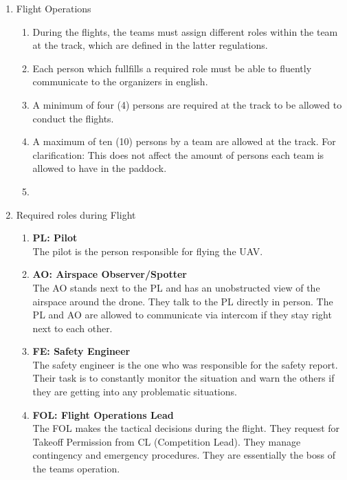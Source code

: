 \begin{enumerate}
    \item{Flight Operations}
    \begin{enumerate}
      \item During the flights, the teams must assign different roles within the team at the track, which are defined in the latter regulations.
      \item Each person which fullfills a required role must be able to fluently communicate to the organizers in english.
      \item A minimum of four (4) persons are required at the track to be allowed to conduct the flights.
      \item A maximum of ten (10) persons by a team are allowed at the track. For clarification: This does not affect the amount of persons each team is allowed to have in the paddock. 
      \item 
    \end{enumerate}

    \item{Required roles during Flight}
    \begin{enumerate}
      \item \textbf{PL: Pilot}\\The pilot is the person responsible for flying the UAV.
      \item \textbf{AO: Airspace Observer/Spotter}\\The AO stands next to the PL and has an unobstructed view of the airspace around the drone. They talk to the PL directly in person. The PL and AO are allowed to communicate via intercom if they stay right next to each other. 
      \item \textbf{FE: Safety Engineer}\\The safety engineer is the one who was responsible for the safety report. Their task is to constantly monitor the situation and warn the others if they are getting into any problematic situations. 
      \item \textbf{FOL: Flight Operations Lead}\\The FOL makes the tactical decisions during the flight. They request for Takeoff Permission from CL (Competition Lead). They manage contingency and emergency procedures. They are essentially the boss of the teams operation.
    \end{enumerate}


\end{enumerate}
